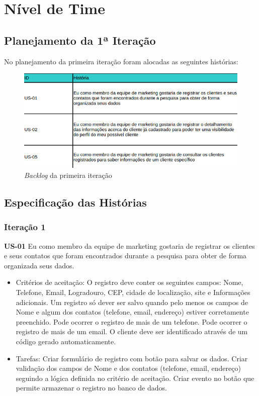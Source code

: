 \chapter[Nível de Time]{Nível de Time}

\section{Planejamento da 1ª Iteração}

No planejamento da primeira iteração foram alocadas as seguintes histórias:

\begin{figure}[!htb]
\centering
\includegraphics[scale=0.5]{figuras/backlog_iteracao.png}
\caption{\textit{Backlog} da primeira iteração}
\label{fig:backlog}
\end{figure}

\section{Especificação das Histórias}

\subsection{Iteração 1}

\textbf{US-01} Eu como membro da equipe de marketing gostaria de registrar os clientes e seus contatos que foram encontrados durante a pesquisa para obter de forma organizada seus dados.

\begin{itemize}
 \item Critérios de aceitação:
\subitem O registro deve conter os seguintes campos: Nome, Telefone, Email, Logradouro, CEP, cidade de localização, site e Informações adicionais.
\subitem Um registro só dever ser salvo quando pelo menos os campos de Nome e algum dos contatos (telefone, email, endereço) estiver corretamente preenchido.
\subitem Pode ocorrer o registro de mais de um telefone.
\subitem Pode ocorrer o registro de mais de um email.
\subitem O cliente deve ser identificado através de um código gerado automaticamente.

\item Tarefas:
\subitem Criar formulário de registro com botão para salvar os dados.
\subitem Criar validação dos campos de Nome e dos contatos (telefone, email, endereço) seguindo a lógica definida no critério de aceitação.
\subitem Criar evento no botão que permite armazenar o registro no banco de dados.
\end{itemize}


